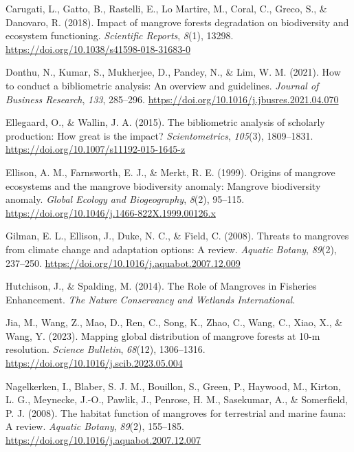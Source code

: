 \documentclass[
  12pt,
]{article}
\newlength{\cslhangindent}
\newlength{\cslentryspacingunit} %
\newenvironment{CSLReferences}[2] %
 {%
  \setlength{\parindent}{0pt}
  \ifodd #1
  \let\oldpar\par
  \def\par{\hangindent=\cslhangindent\oldpar}
  \fi
  \setlength{\parskip}{#2\cslentryspacingunit}
 }%
 {}
\begin{document}
\begin{CSLReferences}{1}{2}
\leavevmode{}%
Carugati, L., Gatto, B., Rastelli, E., Lo Martire, M., Coral, C., Greco, S., \& Danovaro, R. (2018). Impact of mangrove forests degradation on biodiversity and ecosystem functioning. \emph{Scientific Reports}, \emph{8}(1), 13298. \url{https://doi.org/10.1038/s41598-018-31683-0}

\leavevmode{}%
Donthu, N., Kumar, S., Mukherjee, D., Pandey, N., \& Lim, W. M. (2021). How to conduct a bibliometric analysis: {An} overview and guidelines. \emph{Journal of Business Research}, \emph{133}, 285--296. \url{https://doi.org/10.1016/j.jbusres.2021.04.070}

\leavevmode{}%
Ellegaard, O., \& Wallin, J. A. (2015). The bibliometric analysis of scholarly production: {How} great is the impact? \emph{Scientometrics}, \emph{105}(3), 1809--1831. \url{https://doi.org/10.1007/s11192-015-1645-z}

\leavevmode{}%
Ellison, A. M., Farnsworth, E. J., \& Merkt, R. E. (1999). Origins of mangrove ecosystems and the mangrove biodiversity anomaly: {Mangrove} biodiversity anomaly. \emph{Global Ecology and Biogeography}, \emph{8}(2), 95--115. \url{https://doi.org/10.1046/j.1466-822X.1999.00126.x}

\leavevmode{}%
Gilman, E. L., Ellison, J., Duke, N. C., \& Field, C. (2008). Threats to mangroves from climate change and adaptation options: {A} review. \emph{Aquatic Botany}, \emph{89}(2), 237--250. \url{https://doi.org/10.1016/j.aquabot.2007.12.009}

\leavevmode{}%
Hutchison, J., \& Spalding, M. (2014). The {Role} of {Mangroves} in {Fisheries Enhancement}. \emph{The Nature Conservancy and Wetlands International.}

\leavevmode{}%
Jia, M., Wang, Z., Mao, D., Ren, C., Song, K., Zhao, C., Wang, C., Xiao, X., \& Wang, Y. (2023). Mapping global distribution of mangrove forests at 10-m resolution. \emph{Science Bulletin}, \emph{68}(12), 1306--1316. \url{https://doi.org/10.1016/j.scib.2023.05.004}

\leavevmode{}%
Nagelkerken, I., Blaber, S. J. M., Bouillon, S., Green, P., Haywood, M., Kirton, L. G., Meynecke, J.-O., Pawlik, J., Penrose, H. M., Sasekumar, A., \& Somerfield, P. J. (2008). The habitat function of mangroves for terrestrial and marine fauna: {A} review. \emph{Aquatic Botany}, \emph{89}(2), 155--185. \url{https://doi.org/10.1016/j.aquabot.2007.12.007}


\end{CSLReferences}
\end{document}

